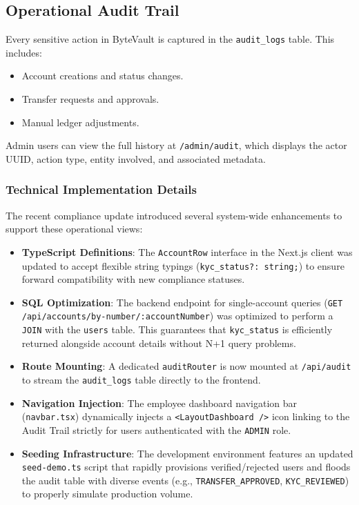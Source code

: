 \subsection{Operational Audit Trail}
Every sensitive action in ByteVault is captured in the \texttt{audit\_logs} table. This includes:
\begin{itemize}
    \item Account creations and status changes.
    \item Transfer requests and approvals.
    \item Manual ledger adjustments.
\end{itemize}
Admin users can view the full history at \texttt{/admin/audit}, which displays the actor UUID, action type, entity involved, and associated metadata.

\subsubsection{Technical Implementation Details}
The recent compliance update introduced several system-wide enhancements to support these operational views:
\begin{itemize}
    \item \textbf{TypeScript Definitions}: The \texttt{AccountRow} interface in the Next.js client was updated to accept flexible string typings (\texttt{kyc\_status?: string;}) to ensure forward compatibility with new compliance statuses.
    \item \textbf{SQL Optimization}: The backend endpoint for single-account queries (\texttt{GET /api/accounts/by-number/:accountNumber}) was optimized to perform a \texttt{JOIN} with the \texttt{users} table. This guarantees that \texttt{kyc\_status} is efficiently returned alongside account details without N+1 query problems.
    \item \textbf{Route Mounting}: A dedicated \texttt{auditRouter} is now mounted at \texttt{/api/audit} to stream the \texttt{audit\_logs} table directly to the frontend.
    \item \textbf{Navigation Injection}: The employee dashboard navigation bar (\texttt{navbar.tsx}) dynamically injects a \texttt{<LayoutDashboard />} icon linking to the Audit Trail strictly for users authenticated with the \texttt{ADMIN} role.
    \item \textbf{Seeding Infrastructure}: The development environment features an updated \texttt{seed-demo.ts} script that rapidly provisions verified/rejected users and floods the audit table with diverse events (e.g., \texttt{TRANSFER\_APPROVED}, \texttt{KYC\_REVIEWED}) to properly simulate production volume.
\end{itemize}
